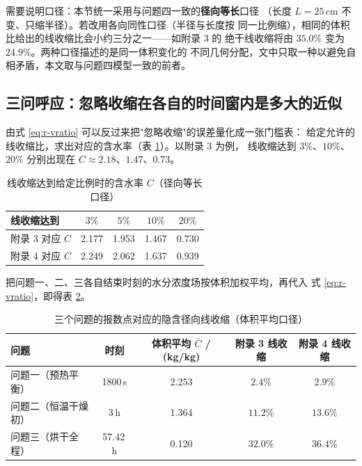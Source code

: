 \documentclass[12pt,a4paper,fontset=none]{ctexart}
\begin{document}
需要说明口径：本节统一采用与问题四一致的\textbf{径向等长}口径
（长度 $L=25$\,cm 不变、只缩半径）。若改用各向同性口径（半径与长度按
同一比例缩），相同的体积比给出的线收缩比会小约三分之一——如附录 3 的
绝干线收缩将由 $35.0\%$ 变为 $24.9\%$。两种口径描述的是同一体积变化的
不同几何分配，文中只取一种以避免自相矛盾，本文取与问题四模型一致的前者。

\subsection{三问呼应：忽略收缩在各自的时间窗内是多大的近似}

由式 \eqref{eq:r-vratio} 可以反过来把"忽略收缩"的误差量化成一张门槛表：
给定允许的线收缩比，求出对应的含水率（表 \ref{tab:r-thr}）。以附录 3 为例，
线收缩达到 $3\%$、$10\%$、$20\%$ 分别出现在 $C\approx2.18$、$1.47$、$0.73$。

\begin{table}[htbp]
  \centering
  \caption{线收缩达到给定比例时的含水率 $C$（径向等长口径）}
  \label{tab:r-thr}
  \small
  \begin{tabular}{lcccc}
    \toprule
    线收缩达到 & $3\%$ & $5\%$ & $10\%$ & $20\%$ \\
    \midrule
    附录 3 对应 $C$ & 2.177 & 1.953 & 1.467 & 0.730 \\
    附录 4 对应 $C$ & 2.249 & 2.062 & 1.637 & 0.939 \\
    \bottomrule
  \end{tabular}
\end{table}

把问题一、二、三各自结束时刻的水分浓度场按体积加权平均，再代入
式 \eqref{eq:r-vratio}，即得表 \ref{tab:r-echo}。

\begin{table}[htbp]
  \centering
  \caption{三个问题的报数点对应的隐含径向线收缩（体积平均口径）}
  \label{tab:r-echo}
  \small
  \begin{tabular}{lcccc}
    \toprule
    问题 & 时刻 & 体积平均 $\bar C$ / (kg/kg)
      & 附录 3 线收缩 & 附录 4 线收缩 \\
    \midrule
    问题一（预热平衡）   & 1800\,s   & 2.253 & $2.4\%$  & $2.9\%$ \\
    问题二（恒温干燥初） & 3\,h      & 1.364 & $11.2\%$ & $13.6\%$ \\
    问题三（烘干全程）   & 57.42\,h  & 0.120 & $32.0\%$ & $36.4\%$ \\
    \bottomrule
  \end{tabular}
\end{table}
\end{document}
